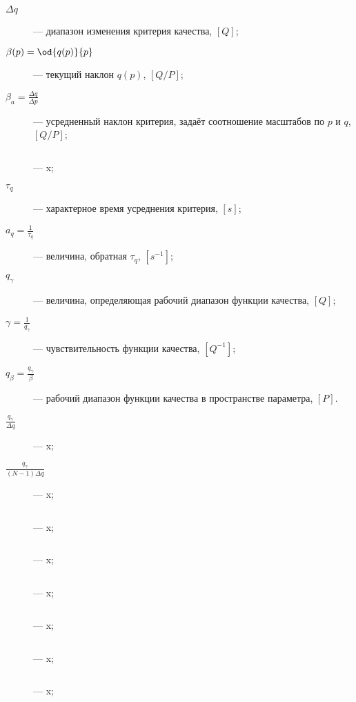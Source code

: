 \begin{description}
  \item[$\Delta q$]  --- диапазон изменения критерия качества, $[Q]$;

  \item[$\beta(p) = \od{q(p)}{p}$]  --- текущий наклон $q(p)$, $[Q/P]$;

  \item[$\beta_a = \frac{\Delta q}{\Delta p} $]  --- усредненный наклон критерия, задаёт соотношение масштабов по $p$ и $q$, $[Q/P]$;

  \item[$ $]  --- x;

  \item[$\tau_q$]  --- характерное время усреднения критерия, $[s]$;

  \item[$a_q = \frac{1}{\tau_q} $]  --- величина, обратная $\tau_q$, $[s^{-1}]$;

  \item[$q_\gamma $]  --- величина, определяющая рабочий диапазон функции качества, $[Q]$;

  \item[$\gamma = \frac{1}{q_\gamma} $]  --- чувствительность функции качества, $[Q^{-1}]$;

  \item[$q_\beta = \frac{q_\gamma}{\beta} $]  --- рабочий диапазон функции качества в пространстве параметра, $[P]$.

  \item[$\frac{q_\gamma}{\Delta q} $]  --- x;

  \item[$\frac{q_\gamma}{(N-1)\Delta q} $]  --- x;

  \item[$ $]  --- x;

  \item[$ $]  --- x;

  \item[$ $]  --- x;

  \item[$ $]  --- x;

  \item[$ $]  --- x;

  \item[$ $]  --- x;


\end{description}



